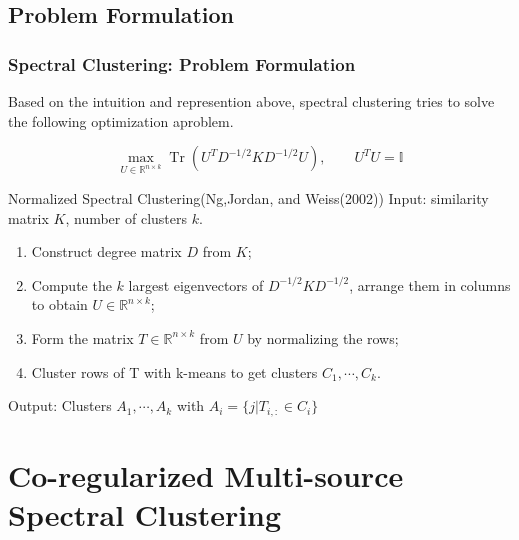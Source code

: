 \documentclass{beamer}
\DeclareMathOperator{\Tr}{Tr}
\begin{document}
\subsection{Problem Formulation}
\begin{frame}
\frametitle{Spectral Clustering: Problem Formulation}
Based on the intuition and represention above, spectral clustering tries to solve the following optimization aproblem.
\begin{block}{}
\begin{equation}
\max_{U\in \mathbb{R}^{n\times k}}\Tr(U^{T}D^{-1/2}KD^{-1/2}U),\qquad U^{T}U=\mathds{I}
\end{equation}
\end{block}
\begin{block}{Normalized Spectral Clustering(Ng,Jordan, and Weiss(2002))}
Input: similarity matrix $K$, number of clusters $k$.
\begin{enumerate}
	\item{Construct degree matrix $D$ from $K$};
	\item{Compute the $k$ largest eigenvectors of $D^{-1/2}KD^{-1/2}$, arrange them in columns to obtain $U\in\mathbb{R}^{n\times k}$};
	\item{Form the matrix $T\in\mathbb{R}^{n\times k}$ from $U$ by normalizing the rows};
	\item{Cluster rows of T with k-means to get clusters $C_1,\cdots,C_k$}.
\end{enumerate}
Output: Clusters $A_1,\cdots,A_k$ with $A_i=\{j|T_{i,:}\in C_i\}$	
\end{block}
\end{frame}

\section{Co-regularized Multi-source Spectral Clustering}
\end{document}
